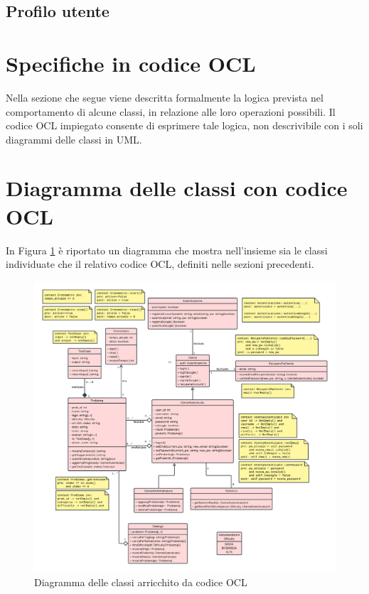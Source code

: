 \documentclass[11pt, a4paper]{article}
\theoremstyle{definition} %
\begin{document}
\newpage
\subsection{Profilo utente}




\newpage
\section{Specifiche in codice OCL}
Nella sezione che segue viene descritta formalmente la logica prevista
nel comportamento di alcune classi, in relazione alle loro operazioni
possibili. Il codice OCL impiegato consente di esprimere tale logica,
non descrivibile con i soli diagrammi delle classi in UML.















\newpage
\section{Diagramma delle classi con codice OCL}
In Figura \ref{umlocl} è riportato un diagramma che mostra nell'insieme
sia le classi individuate che il relativo codice OCL, definiti nelle
sezioni precedenti.

\begin{figure}[H]
\centering
\hspace*{-2.8cm}
\includegraphics[scale = 0.53]{materiale/classdiagram.pdf}
\caption{Diagramma delle classi arricchito da codice OCL}
\label{umlocl}
\end{figure}
\end{document}
